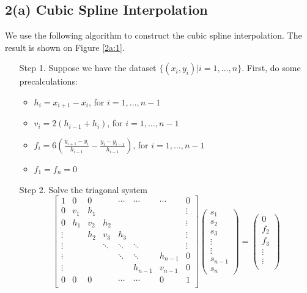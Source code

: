 \documentclass[11pt]{article}
\newcommand{\1}{\mathbbm{1}}
\begin{document}
\subsection*{2(a) Cubic Spline Interpolation}
We use the following algorithm to construct the cubic spline interpolation. The result is shown on Figure \ref{2a:1}.
\begin{enumerate}
	\item [Step 1.] Suppose we have the dataset $\{(x_i,y_i)|i=1,\ldots,n\}$. First, do some precalculations:
	\begin{itemize}
		\item $h_i=x_{i+1}-x_i$, for $i=1,\ldots,n-1$
		\item $v_i=2(h_{i-1}+h_i)$, for $i=1,\ldots,n-1$
		\item $f_i=6\left(\frac{y_{i+1}-y_i}{h_{i-1}}-\frac{y_{i}-y_{i-1}}{h_{i-1}}\right)$, for $i=1,\ldots,n-1$
		\item $f_1=f_n=0$
	\end{itemize}
	\item[Step 2.] Solve the triagonal system 
	\[
	 \begin{bmatrix}
	 	1&0 &0  &  & \cdots & \cdots  &\cdots&0\\
		0&v_1 & h_1 &  &  &   &&\vdots \\
		0&h_1& v_2 & h_2 &  &  &&\vdots \\
		\vdots&& h_2 & v_3 & h_3 &   && \vdots \\
		\vdots&&         &  \ddots       & \ddots & \ddots&& \vdots\\
		\vdots&&         &         & \ddots & \ddots& h_{n-1}&0\\
		\vdots&&         &         &        &  h_{n-1} &v_{n-1}&0\\
		0&0 &0  &  & \cdots & \cdots  &0&1\\
	\end{bmatrix} \begin{pmatrix}
	s_1\\
	s_2\\
	s_3\\
	\vdots\\
	\vdots\\
	s_{n-1}\\
	s_n
\end{pmatrix} = \begin{pmatrix}
0\\
f_2\\
f_3\\
\vdots\\
\vdots\\

\end{pmatrix}\]
\end{enumerate}
\end{document}

